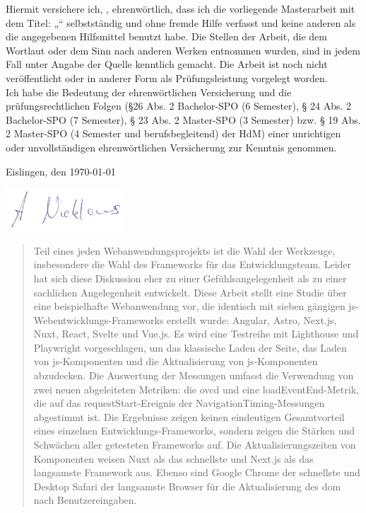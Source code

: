 \documentclass[a4paper, 12pt]{article}
\makeatletter
\let\Title\@title
\let\Author\@author
\makeatother
\begin{document}
	Hiermit versichere ich, \Author, ehrenwörtlich, dass ich die
	vorliegende Masterarbeit mit dem Titel: „\Title“ selbstständig und ohne fremde Hilfe verfasst und keine
	anderen als die angegebenen Hilfsmittel benutzt habe. Die Stellen der Arbeit, die dem
	Wortlaut oder dem Sinn nach anderen Werken entnommen wurden, sind in jedem Fall
	unter Angabe der Quelle kenntlich gemacht. Die Arbeit ist noch nicht veröffentlicht oder
	in anderer Form als Prüfungsleistung vorgelegt worden.\\
	
	Ich habe die Bedeutung der ehrenwörtlichen Versicherung und die prüfungsrechtlichen
	Folgen (§26 Abs. 2 Bachelor-SPO (6 Semester), § 24 Abs. 2 Bachelor-SPO (7 Semester), §
	23 Abs. 2 Master-SPO (3 Semester) bzw. § 19 Abs. 2 Master-SPO (4 Semester und
	berufsbegleitend) der HdM) einer unrichtigen oder unvollständigen ehrenwörtlichen
	Versicherung zur Kenntnis genommen.
	\vspace{30px}
	
	Eislingen, den \today
	\vspace{20px}
	
	\includegraphics[height=60px]{img/unterschrift.png}
	\vspace{10px}
	
	\Author

\pagebreak

\begin{abstract}
  Teil eines jeden Webanwendungsprojekts ist die Wahl der Werkzeuge, insbesondere die Wahl des Frameworks für das Entwicklungsteam.
  Leider hat sich diese Diskussion eher zu einer Gefühlsangelegenheit als zu einer sachlichen Angelegenheit entwickelt.
  Diese Arbeit stellt eine Studie über eine beispielhafte Webanwendung vor, die identisch mit sieben gängigen \acrlong{js}-Webentwicklungs-Frameworks erstellt wurde: Angular, Astro, Next.js, Nuxt, React, Svelte und Vue.js.
  Es wird eine Testreihe mit Lighthouse und Playwright vorgeschlagen, um das klassische Laden der Seite, das Laden von \acrlong{js}-Komponenten und die Aktualisierung von \acrlong{js}-Komponenten abzudecken.
  Die Auswertung der Messungen umfasst die Verwendung von zwei neuen abgeleiteten Metriken: die \acrfull{ovcd} und eine loadEventEnd-Metrik, die auf das requestStart-Ereignis der NavigationTiming-Messungen abgestimmt ist.
  Die Ergebnisse zeigen keinen eindeutigen Gesamtvorteil eines einzelnen Entwicklungs-Frameworks, sondern zeigen die Stärken und Schwächen aller getesteten Frameworks auf.
  Die Aktualisierungszeiten von Komponenten weisen Nuxt als das schnellste und Next.js als das langsamste Framework aus.
  Ebenso sind Google Chrome der schnellste und Desktop Safari der langsamste Browser für die Aktualisierung des \acrshort{dom} nach Benutzereingaben.
\end{abstract}
\end{document}
